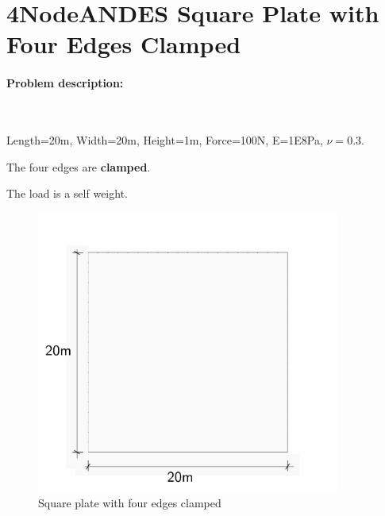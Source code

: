 \documentclass[fleqn,11pt]{article}
\begin{document}
\section{4NodeANDES Square Plate with Four Edges Clamped}



\paragraph{Problem description:} ~



Length=20m, Width=20m, Height=1m, Force=100N, E=1E8Pa, $\nu=0.3$. 

The four edges are \textbf{clamped}. 

The load is a self weight.


\begin{figure}[!htb]
  \centering
  \includegraphics[width=10cm]{../Figure-files/_Chapter_Appendix_Illustrative_Examples/square_plate_descrp.pdf}
  \caption{Square plate with four edges clamped }
  \label{fig 4NodeANDES edges clamped square plate with element side length for program description }
\end{figure}
\end{document}
